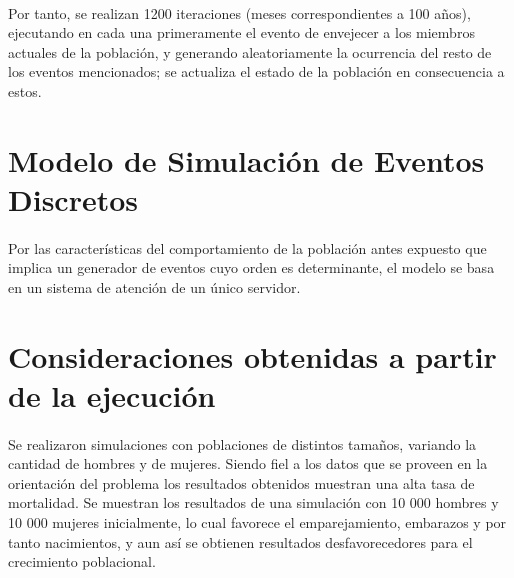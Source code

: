 \documentclass{article}
\begin{document}
        \paragraph{}
        Por tanto, se realizan 1200 iteraciones (meses correspondientes a 100 años), ejecutando
        en cada una primeramente el evento de envejecer a los miembros actuales de la población,
        y generando aleatoriamente la ocurrencia del resto de los eventos mencionados; se actualiza
        el estado de la población en consecuencia a estos.


    \section {Modelo de Simulación de Eventos Discretos}
        \paragraph{} 
        Por las características del comportamiento de la población antes expuesto que implica un generador de eventos
         cuyo orden es determinante, el modelo se basa en un sistema de atención de un único servidor.   
    
    \section {Consideraciones obtenidas a partir de la ejecución}
        \paragraph{}
        Se realizaron simulaciones con poblaciones de distintos tamaños, variando la 
        cantidad de hombres y de mujeres.  
        Siendo fiel a los datos que se proveen en la orientación del problema los resultados
        obtenidos muestran una alta tasa de mortalidad. Se muestran los resultados de una simulación
        con 10 000 hombres y 10 000 mujeres inicialmente, lo cual favorece el emparejamiento, embarazos y
        por tanto nacimientos, y aun así se obtienen resultados desfavorecedores para el crecimiento poblacional.   
    
\end{document}
